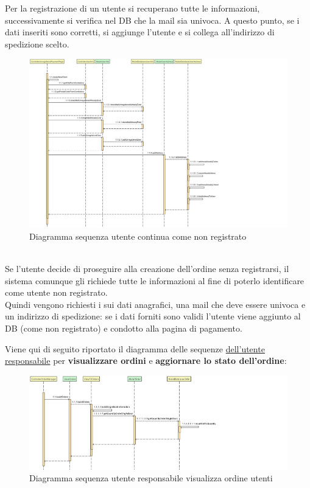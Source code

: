 \documentclass[a4paper,11pt]{report}
\begin{document}
Per la registrazione di un utente si recuperano tutte le informazioni, successivamente si verifica nel DB che la mail sia univoca. A questo punto, se i dati inseriti sono corretti, si aggiunge l'utente e si collega all'indirizzo di spedizione scelto.
\clearpage
\begin{figure}[h!]
    	\centering
    	\hspace*{-0.4in}
    	\includegraphics[width=1.3\linewidth]{Sequence diagrams/2 Order Creation/continueAsUnreg.png}
    	\caption{Diagramma sequenza utente continua come non registrato}
    \end{figure} \leavevmode \\
\leavevmode \newline
Se l'utente decide di proseguire alla creazione dell'ordine senza registrarsi, il sistema comunque gli richiede tutte le informazioni al fine di poterlo identificare come utente non registrato.\\
Quindi vengono richiesti i sui dati anagrafici, una mail che deve essere univoca e un indirizzo di spedizione: se i dati forniti sono validi l'utente viene aggiunto al DB (come non registrato) e condotto alla pagina di pagamento.\\
\clearpage

Viene qui di seguito riportato il diagramma delle sequenze \underline{dell'utente responsabile} per \textbf{visualizzare ordini} e \textbf{aggiornare lo stato dell'ordine}:\\
\begin{figure}[h!]
    	\centering
    	\hspace*{-0.4in}
    	\includegraphics[width=1.7\linewidth]{Sequence diagrams/3 Manager/viewOrderManager.png}
    	\caption{Diagramma sequenza utente responsabile visualizza ordine utenti}
    \end{figure}\\
    
\end{document}
